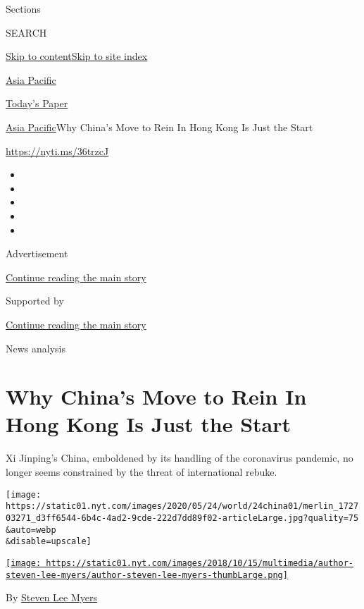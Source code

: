 Sections

SEARCH

\protect\hyperlink{site-content}{Skip to
content}\protect\hyperlink{site-index}{Skip to site index}

\href{https://www.nytimes.com/section/world/asia}{Asia Pacific}

\href{https://myaccount.nytimes.com/auth/login?response_type=cookie\&client_id=vi}{}

\href{https://www.nytimes.com/section/todayspaper}{Today's Paper}

\href{/section/world/asia}{Asia Pacific}\textbar{}Why China's Move to
Rein In Hong Kong Is Just the Start

\url{https://nyti.ms/36trzcJ}

\begin{itemize}
\item
\item
\item
\item
\item
\end{itemize}

Advertisement

\protect\hyperlink{after-top}{Continue reading the main story}

Supported by

\protect\hyperlink{after-sponsor}{Continue reading the main story}

News analysis

\hypertarget{why-chinas-move-to-rein-in-hong-kong-is-just-the-start}{%
\section{Why China's Move to Rein In Hong Kong Is Just the
Start}\label{why-chinas-move-to-rein-in-hong-kong-is-just-the-start}}

Xi Jinping's China, emboldened by its handling of the coronavirus
pandemic, no longer seems constrained by the threat of international
rebuke.

\texttt{[image: https://static01.nyt.com/images/2020/05/24/world/24china01/merlin\_172703271\_d3ff6544-6b4c-4ad2-9cde-222d7dd89f02-articleLarge.jpg?quality=75\\\&auto=webp\\\&disable=upscale]}

\href{https://www.nytimes.com/by/steven-lee-myers}{\texttt{[image: https://static01.nyt.com/images/2018/10/15/multimedia/author-steven-lee-myers/author-steven-lee-myers-thumbLarge.png]}}

By \href{https://www.nytimes.com/by/steven-lee-myers}{Steven Lee Myers}

